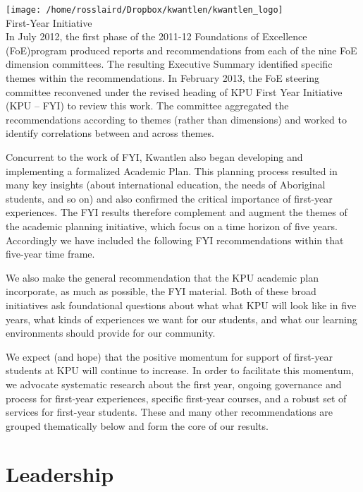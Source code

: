 \documentclass[10pt, letterpaper]{article}
\begin{document}
    \thispagestyle{empty}
    \reversemarginpar
    \noindent
    \texttt{[image: /home/rosslaird/Dropbox/kwantlen/kwantlen\_logo]}\\[1em]
    {\LARGE First-Year Initiative}\\[2em]

In July 2012, the first phase of the 2011-12 Foundations of Excellence
(FoE)program produced reports and recommendations from each of the nine
FoE dimension committees. The resulting Executive Summary identified
specific themes within the recommendations. In February 2013, the FoE
steering committee reconvened under the revised heading of KPU First
Year Initiative (KPU -- FYI) to review this work. The committee
aggregated the recommendations according to themes (rather than
dimensions) and worked to identify correlations between and across themes.

Concurrent to the work of FYI, Kwantlen also began developing and implementing a formalized Academic Plan. This planning process resulted in many key insights (about international education, the needs of Aboriginal students, and so on) and also confirmed the critical importance of first-year experiences. The FYI results therefore complement and augment the themes of the academic planning initiative, which focus on a time horizon of five years. Accordingly we have included the following FYI recommendations within that five-year time frame.

We also make the general recommendation that the KPU academic plan incorporate, as much as possible, the FYI material. Both of these broad initiatives ask foundational questions about what what KPU will look like in five years, what kinds of experiences we want for our students, and what our learning environments should provide for our community.

We expect (and hope) that the positive momentum for support of first-year students at KPU will continue to increase. In order to facilitate this momentum, we advocate systematic research about the first year, ongoing governance and process for first-year experiences, specific first-year courses, and a robust set of services for first-year students. These and many other recommendations are grouped thematically below and form the core of our results.

\section{Leadership}
\end{document}
